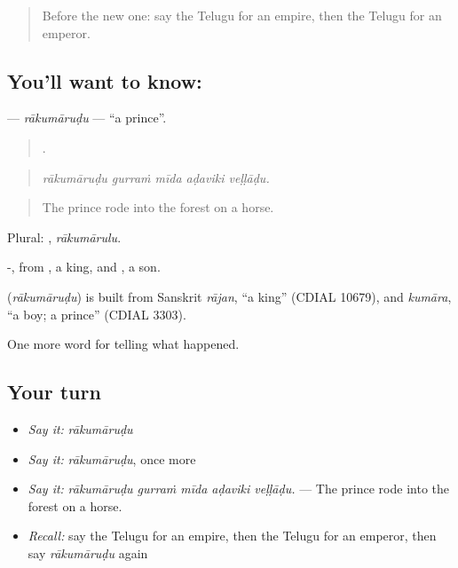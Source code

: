\label{lesson:TE-C359-rakumarudu}



\begin{quote}
Before the new one: say the Telugu for an empire, then the Telugu for an emperor.
\end{quote}

\subsection*{You'll want to know: }
\textbf{} — \emph{rākumāruḍu} — \textquotedblleft{}a prince\textquotedblright{}.

\begin{quote}
    .
\end{quote}

\begin{quote}
\emph{rākumāruḍu gurraṁ mīda aḍaviki veḷḷāḍu.}
\end{quote}

\begin{quote}
The prince rode into the forest on a horse.
\end{quote}

Plural: , \emph{rākumārulu}.

-, from , a king, and , a son.

\begin{cousinweb}
\textbf{} (\emph{rākumāruḍu}) is built from Sanskrit \emph{rājan}, \textquotedblleft{}a king\textquotedblright{} (CDIAL 10679), and \emph{kumāra}, \textquotedblleft{}a boy; a prince\textquotedblright{} (CDIAL 3303).
\end{cousinweb}

\begin{grammarlens}[title={What you've built}]
One more word for telling what happened.
\end{grammarlens}

\subsection*{Your turn}
\begin{itemize}
\raggedright
  \item \emph{Say it:} \emph{rākumāruḍu}
  \item \emph{Say it:} \emph{rākumāruḍu}, once more
  \item \emph{Say it:} \emph{rākumāruḍu gurraṁ mīda aḍaviki veḷḷāḍu.} — The prince rode into the forest on a horse.
  \item \emph{Recall:} say the Telugu for an empire, then the Telugu for an emperor, then say \emph{rākumāruḍu} again
\end{itemize}

